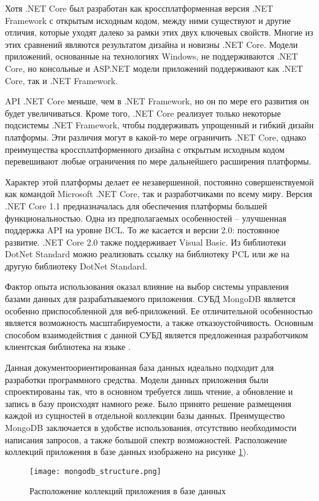 Хотя .NET Core был разработан как кроссплатформенная версия .NET Framework с открытым исходным кодом, между ними существуют и другие отличия, которые уходят далеко за рамки этих двух ключевых свойств. Многие из этих сравнений являются результатом дизайна и новизны .NET Core. Модели приложений, основанные на технологиях Windows, не поддерживаются .NET Core, но консольные и ASP.NET модели приложений поддерживают как .NET Core, так и .NET Framework.

API .NET Core меньше, чем в .NET Framework, но он по мере его развития он будет увеличиваться. Кроме того, .NET Core реализует только некоторые подсистемы .NET Framework, чтобы поддерживать упрощенный и гибкий дизайн платформы. Эти различия могут в какой-то мере ограничить .NET Core, однако преимущества кроссплатформенного дизайна с открытым исходным кодом перевешивают любые ограничения по мере дальнейшего расширения платформы.

Характер этой платформы делает ее незавершенной, постоянно совершенствуемой как командой Microsoft .NET Core, так и разработчиками по всему миру. Версия .NET Core 1.1 предназначалась для обеспечения платформы большей функциональностью. Одна из предполагаемых особенностей – улучшенная поддержка API на уровне BCL. То же касается и версии 2.0: постоянное развитие. .NET Core 2.0 также поддерживает Visual Basic. Из библиотеки DotNet Standard можно реализовать ссылку на библиотеку PCL или же на другую библиотеку DotNet Standard.

Фактор опыта использования оказал влияние на выбор системы управления базами данных для разрабатываемого приложения. СУБД MongoDB является особенно приспособленной для веб-приложений. Ее отличительной особенностью является возможность масштабируемости, а также отказоустойчивость. Основным способом взаимодействия с данной СУБД является предложенная разработчиком клиентская библиотека на языке \csharp.

Данная документоориентированная база данных идеально подходит для разработки программного средства. Модели данных приложения были спроектированы так, что в основном требуется лишь чтение, а обновление и запись в базу происходят намного реже. Было принято решение размещения каждой из сущностей в отдельной коллекции базы данных. Преимущество MongoDB заключается в удобстве использования, отсутствию необходимости написания запросов, а также большой спектр возможностей. Расположение коллекций приложения в базе данных изображено на рисунке \ref{fig:analysis:structure:mongo}).

\begin{figure}[!h]
	\centering
	\texttt{[image: mongodb\_structure.png]} 
	\caption{Расположение коллекций приложения в базе данных}
	\label{fig:analysis:structure:mongo}
\end{figure}


